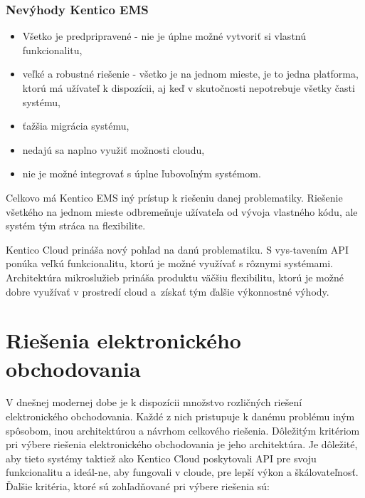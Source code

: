 \documentclass[
  printed, %
  table,   %
  lof,     %
  nolot,     %
  twoside,  
]{fithesis3}
\begin{document}
\subsection{Nevýhody Kentico EMS}
\begin{itemize}
	\item Všetko je predpripravené - nie je úplne možné vytvoriť si vlastnú funkcionalitu,
	\item veľké a robustné riešenie - všetko je na jednom mieste, je to jedna platforma, ktorú má užívateľ k dispozícii, aj keď v skutočnosti nepotrebuje všetky časti systému,
	\item ťažšia migrácia systému,
	\item nedajú sa naplno využiť možnosti cloudu,
	\item nie je možné integrovať s úplne ľubovoľným systémom.
\end{itemize}

Celkovo má Kentico EMS iný prístup k riešeniu danej problematiky. Riešenie všetkého na jednom mieste odbremeňuje užívateľa od vývoja vlastného kódu, ale systém tým stráca na flexibilite.

Kentico Cloud prináša nový pohľad na danú problematiku. S vys-tavením API ponúka veľkú funkcionalitu, ktorú je možné využívať s rôznymi systémami. Architektúra mikroslužieb prináša produktu väčšiu flexibilitu, ktorú je možné dobre využívať v prostredí cloud a~získať tým ďalšie výkonnostné výhody.
\chapter{Riešenia elektronického obchodovania}
V dnešnej modernej dobe je k dispozícii množstvo rozličných riešení elektronického obchodovania. Každé z nich pristupuje k danému problému iným spôsobom, inou architektúrou a návrhom celkového riešenia. Dôležitým kritériom pri výbere riešenia elektronického obchodovania je jeho architektúra. Je dôležité, aby tieto systémy taktiež ako Kentico Cloud poskytovali API pre svoju funkcionalitu a ideál-ne, aby fungovali v cloude, pre lepší výkon a škálovateľnosť. Ďalšie kritéria, ktoré sú zohľadňované pri výbere riešenia sú:
\end{document}
